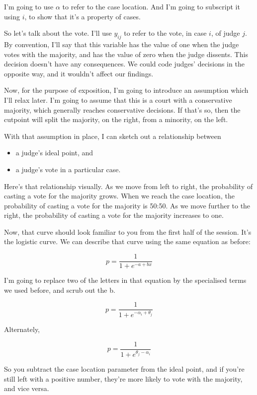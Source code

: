 \documentclass[12pt,twoside]{article}
\providecommand{\tightlist}{%
  \setlength{\itemsep}{0pt}\setlength{\parskip}{0pt}}
\begin{document}
I'm going to use \(\alpha\) to refer to the case location. And I'm going
to subscript it using \(i\), to show that it's a property of cases.

So let's talk about the vote. I'll use \(y_{ij}\) to refer to the vote,
in case \(i\), of judge \(j\). By convention, I'll say that this
variable has the value of one when the judge votes with the majority,
and has the value of zero when the judge dissents. This decision doesn't
have any consequences. We could code judges' decisions in the opposite
way, and it wouldn't affect our findings.

Now, for the purpose of exposition, I'm going to introduce an assumption
which I'll relax later. I'm going to assume that this is a court with a
conservative majority, which generally reaches conservative decisions.
If that's so, then the cutpoint will split the majority, on the right,
from a minority, on the left.

With that assumption in place, I can sketch out a relationship between

\begin{itemize}
\tightlist
\item
  a judge's ideal point, and
\item
  a judge's vote in a particular case.
\end{itemize}

Here's that relationship visually. As we move from left to right, the
probability of casting a vote for the majority grows. When we reach the
case location, the probability of casting a vote for the majority is
50:50. As we move further to the right, the probability of casting a
vote for the majority increases to one.

Now, that curve should look familiar to you from the first half of the
session. It's the logistic curve. We can describe that curve using the
same equation as before:

\[
p = \frac{1}{1 + e^{-a + bx}}
\]

I'm going to replace two of the letters in that equation by the
specialised terms we used before, and scrub out the b.

\[
p = \frac{1}{1 + e^{-\alpha_i + \theta_j}}
\]

Alternately,

\[
p = \frac{1}{1 + e^{\theta_j-\alpha_i}}
\]

So you subtract the case location parameter from the ideal point, and if
you're still left with a positive number, they're more likely to vote
with the majority, and vice versa.
\end{document}
